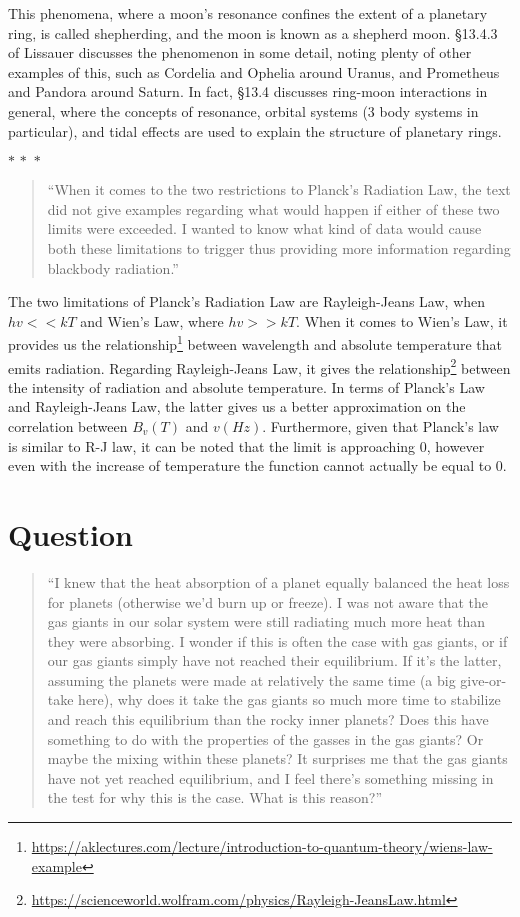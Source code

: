 \documentclass[11pt]{article}
\newcommand{\threestars}{\begin{center}$ {\ast}\,{\ast}\,{\ast} $\end{center}}
\begin{document}
This phenomena, where a moon's resonance confines the extent of a planetary ring, is called shepherding, and the moon is known as a shepherd moon. §13.4.3 of Lissauer discusses the phenomenon in some detail, noting plenty of other examples of this, such as Cordelia and Ophelia around Uranus, and Prometheus and Pandora around Saturn. In fact, §13.4 discusses ring-moon interactions in general, where the concepts of resonance, orbital systems (3 body systems in particular), and tidal effects are used to explain the structure of planetary rings.

\threestars

\begin{quote}
    “When it comes to the two restrictions to Planck’s Radiation Law, the text did not give examples regarding what would happen if either of these two limits were exceeded. I wanted to know what kind of data would cause both these limitations to trigger thus providing more information regarding blackbody radiation.”
\end{quote}

The two limitations of Planck’s Radiation Law are Rayleigh-Jeans Law, when $hv << kT$ and Wien’s Law, where $hv >> kT$. When it comes to Wien's Law, it provides us the relationship\footnote{\url{https://aklectures.com/lecture/introduction-to-quantum-theory/wiens-law-example}} between wavelength and absolute temperature that emits radiation. Regarding Rayleigh-Jeans Law, it gives the relationship\footnote{\url{https://scienceworld.wolfram.com/physics/Rayleigh-JeansLaw.html}} between the intensity of radiation and absolute temperature. In terms of Planck’s Law and Rayleigh-Jeans Law, the latter gives us a better approximation on the correlation between $B_v(T)$ and $v(Hz)$. Furthermore, given that Planck’s law is similar to R-J law, it can be noted that the limit is approaching 0, however even with the increase of temperature the function cannot actually be equal to 0.

	\newpage
	\section{Question}
	
\begin{quote}
    “I knew that the heat absorption of a planet equally balanced the heat loss for planets (otherwise we'd burn up or freeze). I was not aware that the gas giants in our solar system were still radiating much more heat than they were absorbing. I wonder if this is often the case with gas giants, or if our gas giants simply have not reached their equilibrium. If it's the latter, assuming the planets were made at relatively the same time (a big give-or-take here), why does it take the gas giants so much more time to stabilize and reach this equilibrium than the rocky inner planets? Does this have something to do with the properties of the gasses in the gas giants? Or maybe the mixing within these planets? It surprises me that the gas giants have not yet reached equilibrium, and I feel there's something missing in the test for why this is the case. What is this reason?”
\end{quote}
\end{document}
